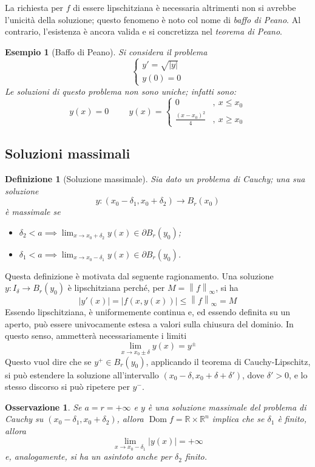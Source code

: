 \documentclass[12pt]{scrartcl}
\theoremstyle{style}
\newtheorem{esempio}{Esempio}[section]
\newtheorem{definizione}{Definizione}[section]
\newtheorem{osservazione}{Osservazione}[section]
\numberwithin{equation}{subsection}
\begin{document}
\noindent La richiesta per $f$ di essere lipschitziana \`e necessaria altrimenti non si avrebbe l'unicit\`a della soluzione; questo fenomeno \`e noto col nome di \textit{baffo di Peano}.
Al contrario, l'esistenza \`e ancora valida e si concretizza nel \textit{teorema di Peano}.
\begin{esempio}
	[Baffo di Peano]
	Si considera il problema 
	\[
	\begin{cases}
		y' = \sqrt{\lvert y \rvert } \\
		y (0) = 0
	\end{cases}
	\] 
Le soluzioni di questo problema non sono uniche; infatti sono:
\[
y(x) = 0 \hspace{1cm} y(x) = \begin{cases}
	0 &,\ x\le x_0\\
	\displaystyle \frac{(x-x_0)^2}{4} &,\ x \ge x_0
\end{cases}
\] 
\end{esempio}
\subsection{Soluzioni massimali}
\begin{definizione}
	[Soluzione massimale]
	Sia dato un problema di Cauchy; una sua soluzione 
	\[
	y : (x_0-\delta _1 , x_0+\delta _2) \to B_r(x_0)
	\] 
	\`e \textit{massimale} se
	\begin{itemize}
		\item $\delta _2<a \implies \displaystyle \lim_{x \to x_0+\delta _2} y(x) \in \partial B_r(y_0)$;
		\item $\delta _1<a \implies \displaystyle \lim_{x \to x_0-\delta _1} y(x) \in \partial B_r(y_0)$.
	\end{itemize}
\end{definizione}
\noindent Questa definizione \`e motivata dal seguente ragionamento.
Una soluzione $y : I_\delta \to B_r(y_0)$ \`e lipschitziana perch\'e, per $M = \left\lVert f \right\rVert _\infty$, si ha 
\[
\lvert y'(x) \rvert = \lvert f(x,y(x)) \rvert \le \left\lVert f \right\rVert _\infty= M
\] 
Essendo lipschitziana, \`e uniformemente continua e, ed essendo definita su un aperto, pu\`o essere univocamente estesa a valori sulla chiusura del dominio. 
In questo senso, ammetter\`a necessariamente i limiti
\[
\lim_{x \to x_0\pm\delta } y(x) = y^{\pm} 
\] 
Questo vuol dire che se $y^+\in B_r(y_0)$, applicando il teorema di Cauchy-Lipschitz, si pu\`o estendere la soluzione all'intervallo $(x_0-\delta ,x_0+\delta +\delta ')$, dove $\delta ' > 0$, e lo stesso discorso si pu\`o ripetere per $y^-$.
\begin{osservazione}
Se $a = r = +\infty$ e $y$ \`e una soluzione massimale del problema di Cauchy su $(x_0-\delta _1,x_0+\delta _2)$, allora $\operatorname{Dom} f = \mathbb{R} \times \mathbb{R}^n	$ implica che se $\delta _1$ \`e finito, allora
\[
\lim_{x \to x_0-\delta _1} \lvert y(x) \rvert =  +\infty
\] 
e, analogamente, si ha un asintoto anche per $\delta _2$ finito.
\end{osservazione}
\end{document}
